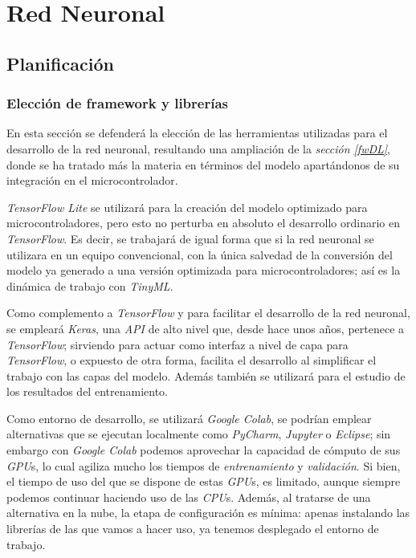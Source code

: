 \chapter{Red Neuronal}

\section{Planificación}
\subsection{Elección de framework y librerías}
En esta sección se defenderá la elección de las herramientas utilizadas
para el desarrollo de la red neuronal, resultando una ampliación de la
\textit{sección \ref{fwDL}}, donde se ha tratado más la materia en términos
del modelo apartándonos de su integración en el microcontrolador.

\textit{TensorFlow Lite} se utilizará para la creación del modelo optimizado
para microcontroladores, pero esto no perturba en absoluto el desarrollo
ordinario en \textit{TensorFlow}. Es decir, se trabajará de igual forma
que si la red neuronal se utilizara en un equipo convencional, con la
única salvedad de la conversión del modelo ya generado a una versión optimizada
para microcontroladores; así es la dinámica de trabajo con \textit{TinyML}.

Como complemento a \textit{TensorFlow} y para facilitar el desarrollo de la
red neuronal, se empleará \textit{Keras}, una \textit{API} de alto nivel
que, desde hace unos años, pertenece a \textit{TensorFlow}; sirviendo para
actuar como interfaz a nivel de capa para \textit{TensorFlow}, o expuesto de
otra forma, facilita el desarrollo al simplificar el trabajo con las capas
del modelo. Además también se utilizará para el estudio de los resultados
del entrenamiento.

Como entorno de desarrollo, se utilizará \textit{Google Colab}, se podrían
emplear alternativas que se ejecutan localmente como \textit{PyCharm},
\textit{Jupyter} o \textit{Eclipse}; sin embargo con \textit{Google Colab}
podemos aprovechar la capacidad de cómputo de sus \textit{GPU}s, lo cual agiliza
mucho los tiempos de \textit{entrenamiento} y \textit{validación}. Si bien,
el tiempo de uso del que se dispone de estas \textit{GPU}s, es limitado, aunque
siempre podemos continuar haciendo uso de las \textit{CPU}s. Además, al tratarse
de una alternativa en la nube, la etapa de configuración es mínima: apenas
instalando las librerías de las que vamos a hacer uso, ya tenemos desplegado
el entorno de trabajo.


